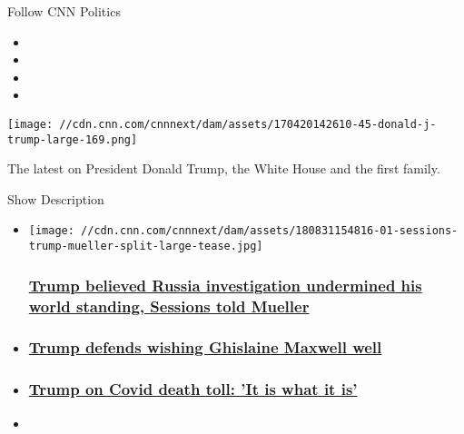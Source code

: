 Follow CNN Politics

\begin{itemize}
\item
\item
\item
\item
\end{itemize}

\texttt{[image: //cdn.cnn.com/cnnnext/dam/assets/170420142610-45-donald-j-trump-large-169.png]}

The latest on President Donald Trump, the White House and the first
family.

Show Description

\begin{itemize}
\item
  \href{/2020/08/03/politics/mueller-investigation-notes/index.html}{}

  \texttt{[image: //cdn.cnn.com/cnnnext/dam/assets/180831154816-01-sessions-trump-mueller-split-large-tease.jpg]}

  \hypertarget{trump-believed-russia-investigation-undermined-his-world-standing-sessions-told-mueller}{%
  \subsubsection{\texorpdfstring{\href{/2020/08/03/politics/mueller-investigation-notes/index.html}{Trump
  believed Russia investigation undermined his world standing, Sessions
  told
  Mueller}}{Trump believed Russia investigation undermined his world standing, Sessions told Mueller}}\label{trump-believed-russia-investigation-undermined-his-world-standing-sessions-told-mueller}}
\item
  \hypertarget{trump-defends-wishing-ghislaine-maxwell-well}{%
  \subsubsection{\texorpdfstring{\href{/2020/08/04/politics/donald-trump-ghislaine-maxwell-axios/index.html}{Trump
  defends wishing Ghislaine Maxwell
  well}}{Trump defends wishing Ghislaine Maxwell well}}\label{trump-defends-wishing-ghislaine-maxwell-well}}
\item
  \hypertarget{trump-on-covid-death-toll-it-is-what-it-is}{%
  \subsubsection{\texorpdfstring{\href{/2020/08/04/politics/trump-covid-death-toll-is-what-it-is/index.html}{Trump
  on Covid death toll: 'It is what it
  is'}}{Trump on Covid death toll: 'It is what it is'}}\label{trump-on-covid-death-toll-it-is-what-it-is}}
\item
  \hypertarget{nobody-likes-me-trump-complains-as-even-his-allies-fade}{%
}
\end{itemize}
